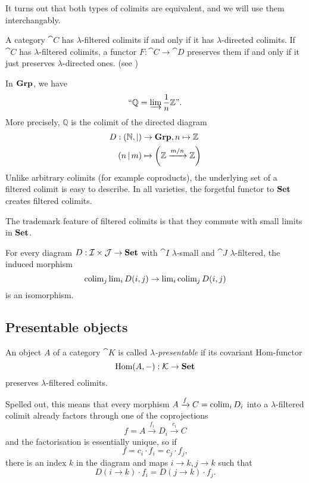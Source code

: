 It turns out that both types of colimits are equivalent, and we will use them interchangably.

\begin{Proposition}A category $\cat C$ has $\lambda$-filtered colimits if and only if it has $\lambda$-directed colimits. If $\cat C$ has $\lambda$-filtered colimits, a functor $F : \cat C \to \cat D$ preserves them if and only if it just preserves $\lambda$-directed ones. (see \cite[Remark 1.21]{AdamekRosicky})
\end{Proposition}

\begin{Example}\label{ex:Q}
In $\mathbf{Grp}$, we have 
\[ \text{``}\mathbb Q = \varinjlim \frac 1 n \mathbb Z\text{''}. \]
More precisely, $\mathbb Q$ is the colimit of the directed diagram
\begin{align*}
 D : (\mathbb N, |) &\to \mathbf{Grp}, n \mapsto \mathbb Z \\
 (n\, | \,m) &\mapsto \left(\mathbb Z \xrightarrow{m/n} \mathbb Z\right)
\end{align*}
Unlike arbitrary colimits (for example coproducts), the underlying set of a filtered colimit is easy to describe. In all varieties, the forgetful functor to $\mathbf{Set}$ creates filtered colimits.
\end{Example}

The trademark feature of filtered colimits is that they commute with small limits in $\mathbf{Set}$.

\begin{Lemma}\label{prop:smallvsfiltered}
For every diagram $D : \mathcal{I} \times \mathcal{J} \to \mathbf{Set}$ with $\cat I$ $\lambda$-small and $\cat J$ $\lambda$-filtered, the induced morphism
\[ \operatorname{colim}_j \operatorname{lim}_i D(i,j) \to \operatorname{lim}_i \operatorname{colim}_j D(i,j) \]
is an isomorphism. \cite[Theorem 1.2.1]{MakkaiPare}
\end{Lemma}

\subsection{Presentable objects}
\begin{Definition}\label{def:presentableobject}
An object $A$ of a category $\cat K$ is called \emph{$\lambda$-presentable} if its covariant Hom-functor 
\[ \textrm{Hom}(A,-) : \mathcal{K} \to \mathbf{Set} \]
preserves $\lambda$-filtered colimits.
\end{Definition}
Spelled out, this means that every morphism $A \xrightarrow{f} C = \operatorname{colim}_i D_i$ into a $\lambda$-filtered colimit already factors through one of the coprojections
\[ f = A \xrightarrow{f_i} D_i \xrightarrow{c_i} C \]
and the factorisation is essentially unique, so if \[ f = c_i\cdot f_i = c_j \cdot f_j, \]
there is an index $k$ in the diagram and maps $i \to k, j \to k$ such that
\[ D(i \to k)\cdot f_i = D(j \to k) \cdot f_j. \]

